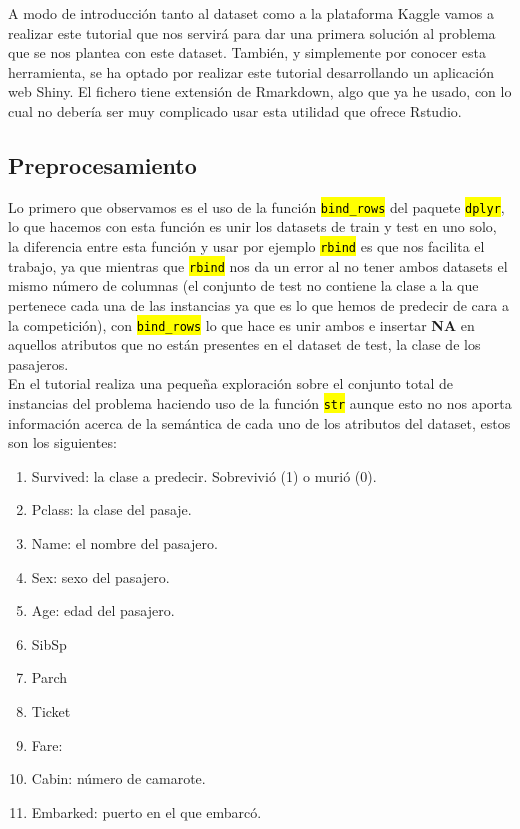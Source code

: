 \documentclass[10pt,a4paper]{article}
\newcommand{\code}[1]{\sethlcolor{rblue}\hl{\texttt{#1}}} %
\begin{document}
%

A modo de introducción tanto al dataset como a la plataforma Kaggle vamos a realizar este tutorial que nos servirá para dar una primera solución al problema que se nos plantea con este dataset. También, y simplemente por conocer esta herramienta, se ha optado por realizar este tutorial desarrollando un aplicación web Shiny. El fichero tiene extensión de Rmarkdown, algo que ya he usado, con lo cual no debería ser muy complicado usar esta utilidad que ofrece Rstudio.

\subsection{Preprocesamiento}

Lo primero que observamos es el uso de la función \code{bind\_rows} del paquete \code{dplyr}, lo que hacemos con esta función es unir los datasets de train y test en uno solo, la diferencia entre esta función y usar por ejemplo \code{rbind} es que nos facilita el trabajo, ya que mientras que \code{rbind} nos da un error al no tener ambos datasets el mismo número de columnas (el conjunto de test no contiene la clase a la que pertenece cada una de las instancias ya que es lo que hemos de predecir de cara a la competición), con \code{bind\_rows} lo que hace es unir ambos e insertar \textbf{NA} en aquellos atributos que no están presentes en el dataset de test, la clase de los pasajeros.\\

En el tutorial realiza una pequeña exploración sobre el conjunto total de instancias del problema haciendo uso de la función \code{str} aunque esto no nos aporta información acerca de la semántica de cada uno de los atributos del dataset, estos son los siguientes:

\begin{enumerate}
\item Survived: la clase a predecir. Sobrevivió (1) o murió (0).
\item Pclass: la clase del pasaje.
\item Name: el nombre del pasajero.
\item Sex: sexo del pasajero.
\item Age: edad del pasajero.
\item SibSp
\item Parch
\item Ticket
\item Fare: 
\item Cabin: número de camarote.
\item Embarked: puerto en el que embarcó.
\end{enumerate}
\end{document}

